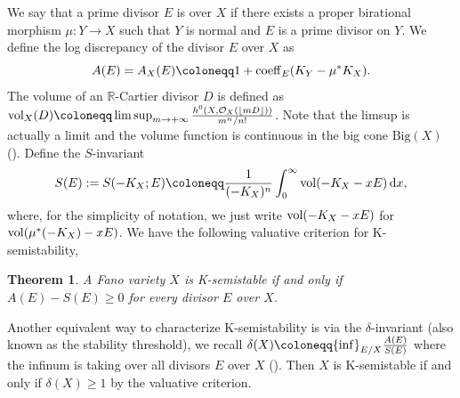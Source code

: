 \documentclass[12pt]{amsart}
\newtheorem{thm}{Theorem}[section]
\theoremstyle{definition}
\def\inf{{\rm inf}}
\def\limsup{{\rm lim\,sup}}
\def\dif{{\rm d}}
\def\vol{{\rm vol}}
\def\coeff{{\rm coeff}}
\newcommand{\IQ}{{\mathbb Q}}
\newcommand{\IR}{{\mathbb R}}
\newcommand{\CO}{{\mathcal O}}
\newcommand{\gee}{\geqslant}
\begin{document}
We say that a prime divisor $E$ is over $X$ if there exists a proper birational morphism $\mu\colon Y\rightarrow X$ such that $Y$ is normal and $E$ is a prime divisor on $Y$. We define the log discrepancy of the divisor $E$ over $X$ as 
$$
A(E)=A_{X}(E)\coloneqq 1+\coeff_{E}(K_{Y}-\mu^*K_X).
$$ 
The volume of an $\IR$-Cartier divisor $D$ is defined as $\vol_X(D)\coloneqq \mathop{\limsup}_{m\rightarrow +\infty}\frac{h^0(X,\CO_X(\lfloor mD\rfloor))}{m^n/n!}$. Note that the limsup is actually a limit and the volume function is continuous in the big cone $\text{Big}(X)$ (\cite[Section 2.2.C]{Lazar04}). Define the $S$-invariant 
$$S(E):=S(-K_X;E)\coloneqq \frac{1}{(-K_X)^n}\int_0^{\infty}\vol(-K_X-xE)\, \dif x, $$%
where, for the simplicity of notation, we just write $\vol(-K_X-xE)$ for $\vol(\mu^*(-K_X)-xE)$. 
We have the following valuative criterion for K-semistability,
\begin{thm}{\cite{Fuj19,Li17}} \label{thm:beta}
    A Fano variety $X$ is K-semistable if and only if %
    $A(E)-S(E)\gee 0$ for every divisor $E$ over $X$. 
\end{thm}
Another equivalent way to characterize K-semistability is via the  $\delta$-invariant (also known as the stability threshold), we recall $\delta(X)\coloneqq \inf_{E/X}\frac{A(E)}{S(E)}$ where the infinum is taking over all divisors $E$ over $X$ (\cite{FO16,BJ20}). Then $X$ is K-semistable if and only if $\delta(X)\gee 1$ by the valuative criterion. 
\end{document}

